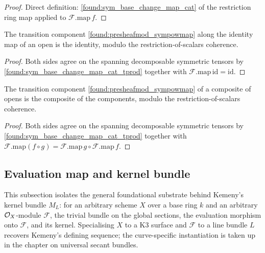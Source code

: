 \begin{proof}
  \leanok
  Direct definition: \cref{found:sym_base_change_map_cat} of the restriction ring map
  applied to \(\mathcal F.\mathrm{map}\,f\).
\end{proof}

\begin{lemma}
  \label{found:presheafmod_sympowmap_id}
  The transition component \cref{found:presheafmod_sympowmap} along the identity map
  of an open is the identity, modulo the restriction-of-scalars coherence.
\end{lemma}

\begin{proof}
  \leanok
  Both sides agree on the spanning decomposable symmetric tensors by
  \cref{found:sym_base_change_map_cat_tprod} together with
  \(\mathcal F.\mathrm{map}\,\mathrm{id}=\mathrm{id}\).
\end{proof}

\begin{lemma}
  \label{found:presheafmod_sympowmap_comp}
  The transition component \cref{found:presheafmod_sympowmap} of a composite of opens
  is the composite of the components, modulo the restriction-of-scalars coherence.
\end{lemma}

\begin{proof}
  \leanok
  Both sides agree on the spanning decomposable symmetric tensors by
  \cref{found:sym_base_change_map_cat_tprod} together with
  \(\mathcal F.\mathrm{map}(f\circ g)=\mathcal F.\mathrm{map}\,g\circ\mathcal F.\mathrm{map}\,f\).
\end{proof}

\subsection{Evaluation map and kernel bundle}

This subsection isolates the general foundational substrate behind Kemeny's kernel
bundle \(M_L\): for an arbitrary scheme \(X\) over a base ring \(k\) and an arbitrary
\(\mathcal{O}_X\)-module \(\mathcal F\), the trivial bundle on the global sections, the
evaluation morphism onto \(\mathcal F\), and its kernel.  Specialising \(X\) to a K3
surface and \(\mathcal F\) to a line bundle \(L\) recovers Kemeny's defining sequence;
the curve-specific instantiation is taken up in the chapter on universal secant bundles.

